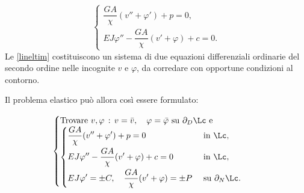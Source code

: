 	\begin{equation}\label{lineltim}
\begin{cases}
 \dfrac{G A}{\chi} (v''+\varphi')+p=0,\\[.2cm]
EJ\varphi''-\dfrac{ G A}{\chi} (v'+\varphi)+c=0.
\end{cases}
\end{equation}
Le \eqref{lineltim} costituiscono un sistema di due equazioni differenziali ordinarie del secondo ordine nelle incognite $v$ e $\varphi$, da corredare con opportune condizioni al contorno.

Il problema elastico può allora così essere formulato:
\begin{definition}
	\begin{equation}
	\begin{cases}
		\mathrm{Trovare~}{v, \varphi}\,:\,v=\bar{v},\quad  \varphi=\bar{\varphi}\mathrm{~su~}\partial_D\Lc\mathrm{~e}\\
		\begin{cases}
			\begin{aligned}
				& \dfrac{G A}{\chi} (v''+\varphi')+p=0 \quad &&\mathrm{~in~}\Lc,\\
				&EJ\varphi''-\dfrac{ G A}{\chi} (v'+\varphi)+c=0 \quad &&\mathrm{~in~}\Lc,\\
& EJ\varphi'=\pm C, \quad  \frac{G A}{\chi} (v'+\varphi)=\pm P &&\mathrm{~su~}\partial_N\Lc.
			\end{aligned}
		\end{cases}
	\end{cases}
\end{equation}
\end{definition}

